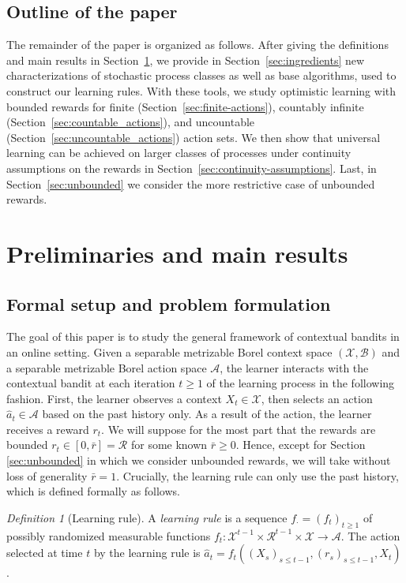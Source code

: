 \documentclass[aos]{imsart}
\theoremstyle{plain}
\theoremstyle{remark}
\newtheorem{definition}[theorem]{Definition}
\newcommand{\Acal}{\mathcal{A}}
\newcommand{\Bcal}{\mathcal{B}}
\newcommand{\Rcal}{\mathcal{R}}
\newcommand{\Xcal}{\mathcal{X}}
\newcommand{\1}{\mathbbm{1}}%
\begin{document}
\subsection{Outline of the paper}
The remainder of the paper is organized as follows. After giving the definitions and main results in Section~\ref{sec:preliminaries}, we provide in Section~\ref{sec:ingredients} new characterizations of stochastic process classes as well as base algorithms, used to construct our learning rules. With these tools, we study optimistic learning with bounded rewards for finite (Section~\ref{sec:finite-actions}), countably infinite (Section~\ref{sec:countable_actions}), and uncountable (Section~\ref{sec:uncountable_actions}) action sets. We then show that universal learning can be achieved on larger classes of processes under continuity assumptions on the rewards in Section~\ref{sec:continuity-assumptions}. Last, in Section~\ref{sec:unbounded} we consider the more restrictive case of unbounded rewards.

\newpage %
\section{Preliminaries and main results}
\label{sec:preliminaries}

\subsection{Formal setup and problem formulation}

The goal of this paper is to study the general framework of contextual bandits in an online setting. Given a separable metrizable Borel context space $(\Xcal,\Bcal)$ and a separable metrizable Borel action space $\Acal$, the learner interacts with the contextual bandit at each iteration $t\geq 1$ of the learning process in the following fashion. First, the learner observes a context $X_t\in \Xcal$, then selects an action $\hat a_t\in\Acal$ based on the past history only. As a result of the action, the learner receives a reward $r_t$. We will suppose for the most part that the rewards are bounded $r_t\in[0,\bar r] = \Rcal$ for some known $\bar r\geq 0$. Hence, except for Section \ref{sec:unbounded} in which we consider unbounded rewards, we will take without loss of generality $\bar r=1$. Crucially, the learning rule can only use the past history, which is defined formally as follows.

\begin{definition}[Learning rule]
    A \emph{learning rule} is a sequence $f_\cdot =(f_t)_{t\geq 1}$ of possibly randomized measurable functions $f_t:\Xcal^{t-1}\times \Rcal^{t-1}\times \Xcal\to \Acal$. The action selected at time $t$ by the learning rule is $\hat a_t = f_t((X_s)_{s\leq t-1},(r_s)_{s\leq t-1},X_t)$.
\end{definition}
\end{document}
